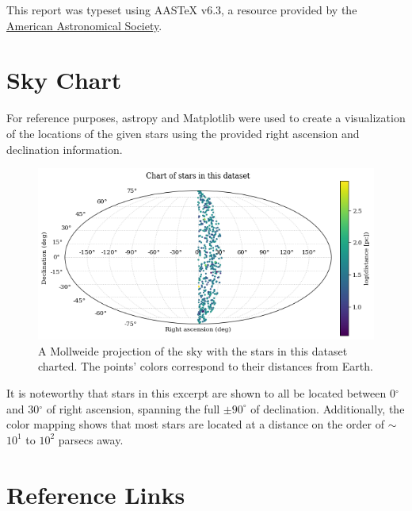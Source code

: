 \documentclass[twocolumn]{aastex63}
\begin{document}
This report was typeset using AAS\TeX{} v6.3, a resource provided by the \href{https://journals.aas.org/aastex-package-for-manuscript-preparation/}{American Astronomical Society}.



{}


\appendix
\section{Sky Chart} \label{sec:skymap}

For reference purposes, astropy and  Matplotlib were used to create a visualization of the locations of the given stars using the provided right ascension and declination information.

\begin{figure}[!h]
    \centering
    \includegraphics[width=\textwidth]{skymap.png}
    \caption{A Mollweide projection of the sky with the stars in this dataset charted. The points' colors correspond to their distances from Earth.}
    \label{fig:skymap}
\end{figure}

It is noteworthy that stars in this excerpt are shown to all be located between 0$^{\circ}$ and 30$^{\circ}$ of right ascension, spanning the full $\pm90^{\circ}$ of declination. Additionally, the color mapping shows that most stars are located at a distance on the order of $\sim$$10^1$ to $10^2$ parsecs away.

\section{Reference Links} \label{sec:links}
\end{document}
